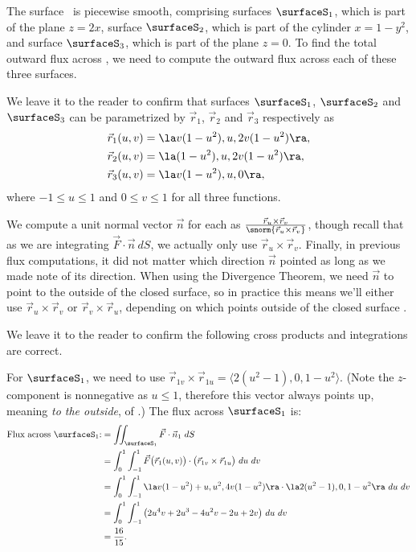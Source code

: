 {The surface \surfaceS\ is piecewise smooth, comprising surfaces $\surfaceS_1$, which is part of the plane $z=2x$, surface $\surfaceS_2$, which is part of the cylinder $x=1-y^2$, and surface $\surfaceS_3$, which is part of the plane $z=0$. To find the total outward flux across \surfaceS, we need to compute the outward flux across each of these three surfaces.

We leave it to the reader to confirm that surfaces $\surfaceS_1$, $\surfaceS_2$ and $\surfaceS_3$ can be parametrized by $\vec r_1$, $\vec r_2$ and $\vec r_3$ respectively as
\begin{align*}
\vec r_1(u,v) &= \la v(1-u^2), u, 2v(1-u^2)\ra, \\
\vec r_2(u,v) &= \la (1-u^2), u, 2v(1-u^2)\ra,\\
\vec r_3(u,v) &= \la v(1-u^2), u, 0\ra,
\end{align*}
where $-1\leq u\leq 1$ and $0\leq v\leq 1$ for all three functions.

We compute a unit normal vector $\vec n$ for each as $\frac{\vec r_u\times\vec r_v}{\snorm{\vec r_u\times\vec r_v}}$, though recall that as we are integrating $\vec F\cdot \vec n\ dS$, we actually only use $\vec r_u\times\vec r_v$. Finally, in previous flux computations, it did not matter which direction $\vec n$ pointed as long as we made note of its direction. When using the Divergence Theorem, we need $\vec n$ to point to the outside of the closed surface, so in practice this means we'll either use $\vec r_u\times\vec r_v$ or $\vec r_v\times\vec r_u$, depending on which points outside of the closed surface \surfaceS.

We leave it to the reader to confirm the following cross products and integrations are correct.

For $\surfaceS_1$, we need to use $\vec r_{1v}\times\vec r_{1u} = \langle 2(u^2-1),0,1-u^2\rangle$. (Note the $z$-component is nonnegative as $u\leq 1$, therefore this vector always points up, meaning \emph{to the outside}, of \surfaceS.) The flux across $\surfaceS_1$ is:
\begin{align*}
\text{Flux across $\surfaceS_1$:} &= \iint_{\surfaceS_1} \vec F\cdot \vec n_1\ dS \\
		&= \int_0^1\int_{-1}^1 \vec F\big(\vec r_1(u,v)\big)\cdot \big(\vec r_{1v}\times\vec r_{1u}\big)\ du\ dv\\
		&= \int_0^1\int_{-1}^1 \la v(1-u^2)+u, u^2,4v(1-u^2)\ra \cdot \la 2(u^2-1),0,1-u^2\ra\ du\ dv\\
		&= \int_0^1\int_{-1}^1 \big(2u^4v+2u^3-4u^2v-2u+2v\big)\ du\ dv\\
		&= \frac{16}{15}.
\end{align*}

}
